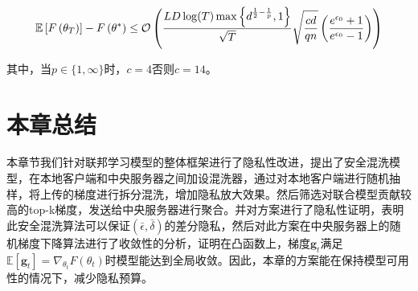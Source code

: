 \begin{equation}\label{eq:模型收敛性证明4}
\mathbb{E}\left[F\left(\theta_{T}\right)\right]-F\left(\theta^{*}\right) \leq \\
\mathcal{O}\left(\frac{L D \log (T) \max \left\{d^{\frac{1}{2}-\frac{1}{p}}, 1\right\}}{\sqrt{T}} \sqrt{\frac{c d}{q n}}\left(\frac{e^{\epsilon_{0}}+1}{e^{\epsilon_{0}}-1}\right)\right)
\end{equation}

其中，当$p \in\{1, \infty\}$时，$c=4$否则$c=14$。

\section{本章总结}
本章节我们针对联邦学习模型的整体框架进行了隐私性改进，提出了安全混洗模型，在本地客户端和中央服务器之间加设混洗器，通过对本地客户端进行随机抽样，将上传的梯度进行拆分混洗，增加隐私放大效果。然后筛选对联合模型贡献较高的top-k梯度，发送给中央服务器进行聚合。并对方案进行了隐私性证明，表明此安全混洗算法可以保证$(\bar{\epsilon}, \bar{\delta})$的差分隐私，然后对此方案在中央服务器上的随机梯度下降算法进行了收敛性的分析，证明在凸函数上，梯度$\mathbf{g}_{t}$满足$\mathbb{E}\left[\mathbf{g}_{t}\right]=\nabla_{\theta_{t}} F\left(\theta_{t}\right)$时模型能达到全局收敛。因此，本章的方案能在保持模型可用性的情况下，减少隐私预算。


